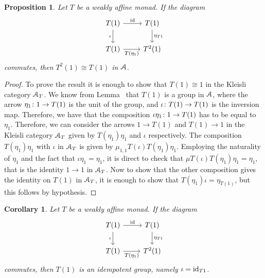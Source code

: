 \documentclass[a4paper,UKenglish,numberwithinsect,cleveref, autoref, thm-restate]{lipics-v2021}
\theoremstyle{plain} %
\newtheorem{mycorollary}[mytheorem]{Corollary}
\newtheorem{myproposition}[mytheorem]{Proposition}
\theoremstyle{definition} %
\begin{document}
\begin{myproposition}
Let $T$ be a weakly affine monad. If the diagram
\[\begin{tikzcd}
	{T(1)} & {T(1)} \\
	{T(1)} & {T^2(1)}
	\arrow["\iota"', from=1-1, to=2-1]
	\arrow["{T(\eta_1)}"', from=2-1, to=2-2]
	\arrow["\id",from=1-1, to=1-2]
	\arrow["{\eta_{T1}}", from=1-2, to=2-2]
\end{tikzcd}\]
commutes, then $T^2(1)\cong T(1)$ in $\mA$. 

\end{myproposition}
\begin{proof}
	To prove the result it is enough to show that $T(1)\cong 1$ in the Kleisli category $\mA_T$.
We know from Lemma~\label{lem:T1_group} that $T(1)$ is a group in $\mA$, where the arrow $\freccia{1}{\eta_1}{T(1)}$ is the unit of the group, and $\freccia{T(1)}{\iota}{T(1)}$ is the inversion map. Therefore, we have that the composition $\freccia{1}{\iota\eta_1}{T(1)}$ has to be equal to $\eta_1$. Therefore, we can consider the arrows $1\to T(1)$ and $T(1)\to 1$ in the Kleisli category $\mA_T$ given by $T(\eta_1)\eta_1$ and $\iota$ respectively. The composition $T(\eta_1)\eta_1$ with $\iota$ in $\mA_T$ is given by $\mu_{1,1}T(\iota)T(\eta_1)\eta_1$. Employing the naturality of $\eta_1$ and the fact that $\iota\eta_1=\eta_1$, it is direct to check that $\mu T(\iota)T(\eta_1)\eta_1=\eta_1$, that is the identity $1\to 1$ in $\mA_T$. Now to show that the other composition gives the identity on $T(1)$ in $\mA_T$, it is enough to show that $T(\eta_1)\iota=\eta_{T(1)}$, but this follows by hypothesis.
\end{proof}
\begin{mycorollary}
	Let $T$ be a weakly affine monad. If the diagram
	\[\begin{tikzcd}
		{T(1)} & {T(1)} \\
		{T(1)} & {T^2(1)}
		\arrow["\iota"', from=1-1, to=2-1]
		\arrow["{T(\eta_1)}"', from=2-1, to=2-2]
		\arrow["\id",from=1-1, to=1-2]
		\arrow["{\eta_{T1}}", from=1-2, to=2-2]
	\end{tikzcd}\]
	commutes, then $T(1)$ is an idempotent group, namely $\iota=\id_{T1}$.
\end{mycorollary}
\end{document}
